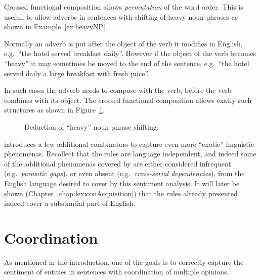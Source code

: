 Crossed functional composition allows \emph{permutation} of the word order. This is usefull to allow adverbs in sentences with shifting of heavy noun phrases as shown in Example~\ref{ex:heavyNP}.

\begin{example}
Normally an adverb is put after the object of the verb it modifies in English, e.g.\ ``the hotel served breakfast daily''. However if the object of the verb becomes ``heavy'' it may sometimes be moved to the end of the sentence, e.g.\ ``the hotel served daily a large breakfast with fresh juice''.

In such cases the adverb needs to compose with the verb, before the verb combines with its object. The crossed functional composition allows exatly such structures as shown in Figure~\ref{fig:heavyNP}.

\begin{figure}[ht]
\vspace{2em}
\center
{}
\caption{Deduction of ``heavy'' noun phrase shifting.}
\label{fig:heavyNP}
\vspace{1em}
\end{figure}
\label{ex:heavyNP}
\end{example}
\done

\citeauthor{ts}  introduces a few additional combinators to capture even more ``exotic'' linguistic phenomenas. Recollect that the rules are language independent, and indeed some of the additional phenomenas covered by \citeauthor{sp} are either considered infrequent (e.g.\ \emph{parasitic gaps}), or even absent (e.g.\ \emph{cross-serial dependencies}), from the English language desired to cover by this sentiment analysis. It will later be shown (Chapter~\ref{chap:lexiconAcquisition}) that the rules already presented indeed cover a substantial part of English.

\section{Coordination}
As mentioned in the introduction, one of the goals is to correctly capture the sentiment of entities in sentences with coordination of multiple opinions.


